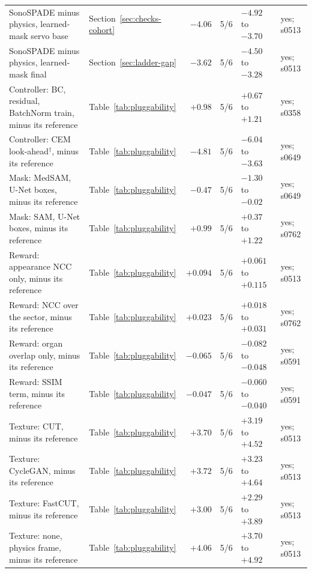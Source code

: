 \begin{table}[tbp]
\begin{tabularx}{\textwidth}{@{}>{\raggedright\arraybackslash}X l r r l l@{}}
SonoSPADE minus physics, learned-mask servo base & Section~\ref{sec:checks-cohort} & $-4.06$ & 5/6 & $-4.92$ to $-3.70$ & yes; s0513 \\
SonoSPADE minus physics, learned-mask final & Section~\ref{sec:ladder-gap} & $-3.62$ & 5/6 & $-4.50$ to $-3.28$ & yes; s0513 \\
Controller: BC, residual, BatchNorm train, minus its reference & Table~\ref{tab:pluggability} & $+0.98$ & 5/6 & $+0.67$ to $+1.21$ & yes; s0358 \\
Controller: CEM look-ahead$^{\dagger}$, minus its reference & Table~\ref{tab:pluggability} & $-4.81$ & 5/6 & $-6.04$ to $-3.63$ & yes; s0649 \\
Mask: MedSAM, U-Net boxes, minus its reference & Table~\ref{tab:pluggability} & $-0.47$ & 5/6 & $-1.30$ to $-0.02$ & yes; s0649 \\
Mask: SAM, U-Net boxes, minus its reference & Table~\ref{tab:pluggability} & $+0.99$ & 5/6 & $+0.37$ to $+1.22$ & yes; s0762 \\
Reward: appearance NCC only, minus its reference & Table~\ref{tab:pluggability} & $+0.094$ & 5/6 & $+0.061$ to $+0.115$ & yes; s0513 \\
Reward: NCC over the sector, minus its reference & Table~\ref{tab:pluggability} & $+0.023$ & 5/6 & $+0.018$ to $+0.031$ & yes; s0762 \\
Reward: organ overlap only, minus its reference & Table~\ref{tab:pluggability} & $-0.065$ & 5/6 & $-0.082$ to $-0.048$ & yes; s0591 \\
Reward: SSIM term, minus its reference & Table~\ref{tab:pluggability} & $-0.047$ & 5/6 & $-0.060$ to $-0.040$ & yes; s0591 \\
Texture: CUT, minus its reference & Table~\ref{tab:pluggability} & $+3.70$ & 5/6 & $+3.19$ to $+4.52$ & yes; s0513 \\
Texture: CycleGAN, minus its reference & Table~\ref{tab:pluggability} & $+3.72$ & 5/6 & $+3.23$ to $+4.64$ & yes; s0513 \\
Texture: FastCUT, minus its reference & Table~\ref{tab:pluggability} & $+3.00$ & 5/6 & $+2.29$ to $+3.89$ & yes; s0513 \\
Texture: none, physics frame, minus its reference & Table~\ref{tab:pluggability} & $+4.06$ & 5/6 & $+3.70$ to $+4.92$ & yes; s0513 \\
\bottomrule
\end{tabularx}
\end{table}
